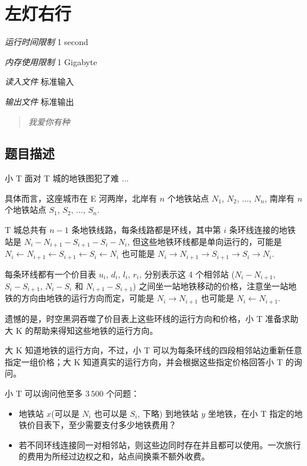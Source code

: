 \section[B. 左灯右行]{ 左灯右行}

\textit{运行时间限制}   1 second

\textit{内存使用限制} 1 Gigabyte

\textit{读入文件} \qquad 标准输入

\textit{输出文件} \qquad 标准输出


\begin{quote}
	\textit{我爱你有种}
\end{quote}


\subsection{题目描述}

小 T 面对 T 城的地铁图犯了难 ...

具体而言，这座城市在 E 河两岸，北岸有 $n$ 个地铁站点 $N_1$, $N_2$, $\ldots$, $N_n$, 南岸有 $n$ 个地铁站点 $S_1$, $S_2$, $\ldots$, $S_n$.

T 城总共有 $n - 1$ 条地铁线路，每条线路都是环线，其中第 $i$ 条环线连接的地铁站是 $N_i - N_{i + 1} - S_{i + 1} - S_i - N_i$, 但这些地铁环线都是单向运行的，可能是 $N_i \leftarrow N_{i + 1} \leftarrow S_{i + 1} \leftarrow S_i \leftarrow N_i$ 也可能是 $N_i \rightarrow N_{i + 1} \rightarrow S_{i + 1} \rightarrow S_i \rightarrow N_i$.


每条环线都有一个价目表 $u_i$, $d_i$, $l_i$, $r_i$, 分别表示这 4 个相邻站 ($N_i - N_{i + 1}$, $S_i - S_{i + 1}$, $N_i - S_i$ 和 $N_{i + 1} - S_{i + 1}$) 之间坐一站地铁移动的价格，注意坐一站地铁的方向由地铁的运行方向而定，可能是 $N_i \rightarrow N_{i + 1}$ 也可能是 $N_{i} \leftarrow N_{i + 1}$.

遗憾的是，时空黑洞吞噬了价目表上这些环线的运行方向和价格，小 T 准备求助大 K 的帮助来得知这些地铁的运行方向。

大 K 知道地铁的运行方向，不过，小 T 可以为每条环线的四段相邻站边重新任意指定一组价格；大 K 知道真实的运行方向，并会根据这些指定价格回答小 T 的询问。

小 T 可以询问他至多 $3\,500$ 个问题：

\begin{itemize}
	\item 地铁站 $x$(可以是 $N_i$ 也可以是 $S_i$, 下略) 到地铁站 $y$ 坐地铁，在小 T 指定的地铁价目表下，至少需要支付多少地铁费用？
   \item 若不同环线连接同一对相邻站，则这些边同时存在并且都可以使用。一次旅行的费用为所经过边权之和，站点间换乘不额外收费。
\end{itemize}


